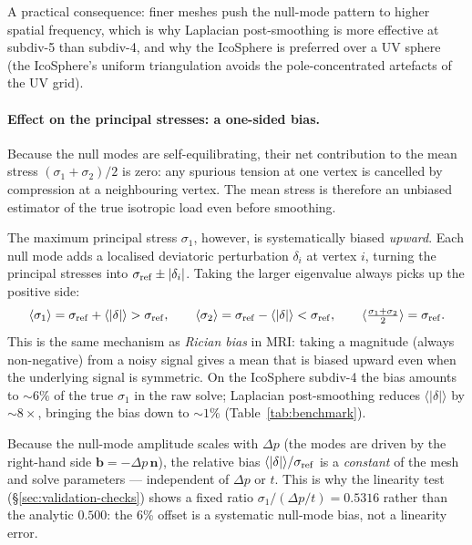 \documentclass[11pt]{article}
\newcommand{\vv}[1]{\bm{#1}}          %
\newcommand{\nn}{\vv{n}}               %
\begin{document}
A practical consequence: finer meshes push the null-mode pattern to
higher spatial frequency, which is why Laplacian post-smoothing is more
effective at subdiv-5 than subdiv-4, and why the IcoSphere is preferred
over a UV sphere (the IcoSphere's uniform triangulation avoids the
pole-concentrated artefacts of the UV grid).

\paragraph{Effect on the principal stresses: a one-sided bias.}
Because the null modes are self-equilibrating, their net contribution to
the mean stress $(\sigma_1+\sigma_2)/2$ is zero: any spurious tension at
one vertex is cancelled by compression at a neighbouring vertex.  The
mean stress is therefore an unbiased estimator of the true isotropic
load even before smoothing.

The maximum principal stress $\sigma_1$, however, is systematically
biased \emph{upward}.  Each null mode adds a localised deviatoric
perturbation $\delta_i$ at vertex $i$, turning the principal stresses
into $\sigma_{\rm ref}\pm|\delta_i|$.  Taking the larger eigenvalue
always picks up the positive side:
\begin{equation}
  \langle\sigma_1\rangle
    = \sigma_{\rm ref} + \langle|\delta|\rangle > \sigma_{\rm ref},
  \qquad
  \langle\sigma_2\rangle
    = \sigma_{\rm ref} - \langle|\delta|\rangle < \sigma_{\rm ref},
  \qquad
  \langle\tfrac{\sigma_1+\sigma_2}{2}\rangle = \sigma_{\rm ref}.
  \label{eq:rician-bias}
\end{equation}
This is the same mechanism as \emph{Rician bias} in MRI: taking a
magnitude (always non-negative) from a noisy signal gives a mean that
is biased upward even when the underlying signal is symmetric.  On the
IcoSphere subdiv-4 the bias amounts to ${\sim}6\%$ of the true
$\sigma_1$ in the raw solve; Laplacian post-smoothing reduces
$\langle|\delta|\rangle$ by ${\sim}8\times$, bringing the bias down to
${\sim}1\%$ (Table~\ref{tab:benchmark}).

Because the null-mode amplitude scales with $\Delta p$ (the modes are
driven by the right-hand side $\vv{b}=-\Delta p\,\nn$), the relative
bias $\langle|\delta|\rangle/\sigma_{\rm ref}$ is a \emph{constant} of the
mesh and solve parameters — independent of $\Delta p$ or $t$.  This is
why the linearity test (§\ref{sec:validation-checks}) shows a fixed ratio
$\sigma_1/(\Delta p/t)=0.5316$ rather than the analytic $0.500$: the
6\% offset is a systematic null-mode bias, not a linearity error.
\end{document}
